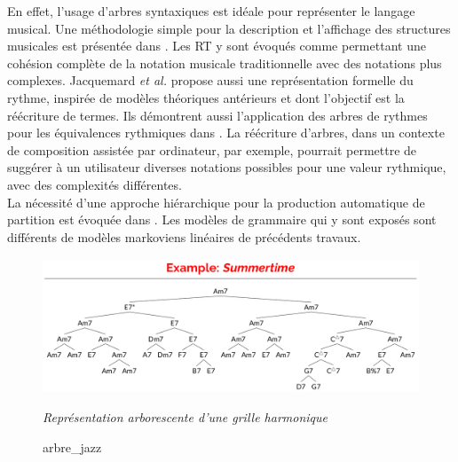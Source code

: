 En effet, l’usage d’arbres syntaxiques est idéale pour représenter le langage musical. Une méthodologie simple pour la description et l'affichage des structures musicales est présentée dans \cite{rythm_tree}. Les RT y sont évoqués comme permettant une cohésion complète de la notation musicale traditionnelle avec des notations plus complexes. Jacquemard \textit{et al.} \cite{jacquemard:hal-01134096} propose aussi une représentation formelle du rythme, inspirée de modèles théoriques antérieurs et dont l’objectif est la réécriture de termes. Ils démontrent aussi l’application des arbres de rythmes pour les équivalences rythmiques dans \cite{jacquemard:hal-01403982}. La réécriture d’arbres, dans un contexte de composition assistée par ordinateur, par exemple, pourrait permettre de suggérer à un utilisateur diverses notations possibles pour une valeur rythmique, avec des complexités différentes.\\La nécessité d’une approche hiérarchique pour la production automatique de partition est évoquée dans \cite{foscarin:hal-01988990}. Les modèles de grammaire qui y sont exposés sont différents de modèles markoviens linéaires de précédents travaux.\newpage
\begin{figure}[h]
	\centering
	\includegraphics[height=40mm, width=120mm]{z_images/2_etat_de_l_art/summertime_tree.png}
	\caption{arbre\_jazz}
	\textit{Représentation arborescente d’une grille harmonique} \cite{harasimjazz}
\end{figure}
